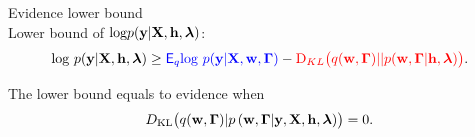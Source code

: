 \documentclass[usenames,dvipsnames,11pt,pdf,utf8,russian,aspectratio=169]{beamer}
\begin{document}
\begin{frame}{Evidence lower bound}
~\\Lower bound of $\text{log}{{p}}(\mathbf{y}|\mathbf{X}, \mathbf{h}, \boldsymbol{\lambda})$:
$$                                                                                                                                              
        \text{log}~p(\mathbf{y}|\mathbf{X}, \mathbf{h}, \boldsymbol{\lambda}) \geq 
\textcolor{blue}{\mathsf{E}_q \text{log}~{p(\mathbf{y} | \mathbf{X}, \mathbf{w}, \boldsymbol{\Gamma})}} - \textcolor{red}{\text{D}_{KL}\bigl(q(\mathbf{w}, \boldsymbol{\Gamma})||p(\mathbf{w}, \boldsymbol{\Gamma}| \mathbf{h}, \boldsymbol{\lambda})\bigr)}.
$$ 



The lower bound equals to evidence when $$D_\text{KL}\bigl(q(\mathbf{w}, \boldsymbol{\Gamma})|p\left(\mathbf{w}, \boldsymbol{\Gamma}|\mathbf{y}, \mathbf{X}, \mathbf{h}, \boldsymbol{\lambda}\right)\bigr)=0.$$

\end{frame}      
\end{document}
